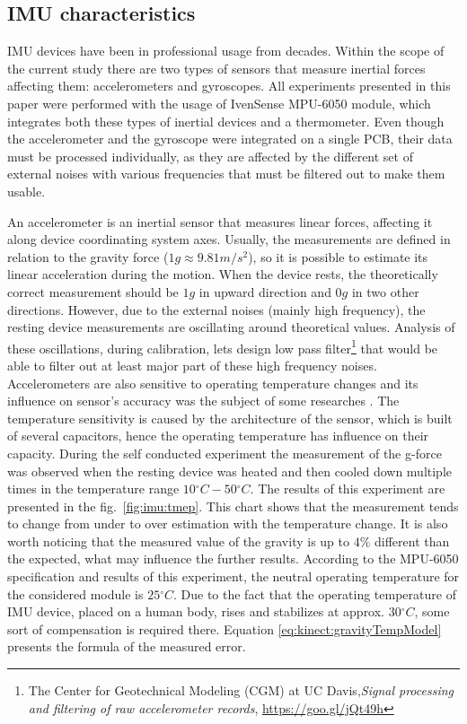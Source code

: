 \documentclass[sensors,article,submit,moreauthors,pdftex,10pt,a4paper]{mdpi}
\newcommand{\degree}{\ensuremath{{}^{\circ}}\xspace}
\begin{document}
	\subsection{IMU characteristics}
	IMU devices have been in professional usage from decades. Within the scope of the current study there are two types of sensors that measure inertial forces affecting them: accelerometers and gyroscopes. All experiments presented in this paper were performed with the usage of IvenSense MPU-6050 module, which integrates both these types of inertial devices and a thermometer. Even though the accelerometer and the gyroscope were integrated on a single PCB, their data must be processed individually, as they are affected by the different set of external noises with various frequencies that must be filtered out to make them usable.
	
	An accelerometer is an inertial sensor that measures linear forces, affecting it along device coordinating system axes. Usually, the measurements are defined in relation to the gravity force ($1g \approx 9.81  m/{s^2}$), so it is possible to estimate its linear acceleration during the motion. When the device rests, the theoretically correct measurement should be $1g$ in upward direction and $0g$ in two other directions. However, due to the external noises (mainly high frequency), the resting device measurements are oscillating around theoretical values. Analysis of these oscillations, during calibration, lets design low pass filter\footnote{The Center for Geotechnical Modeling (CGM) at UC Davis,\textit{Signal processing and filtering of raw accelerometer records}, \url{https://goo.gl/jQt49h}}\cite{Wang2011} that would be able to filter out at least major part of these high frequency noises. Accelerometers are also sensitive to operating temperature changes and its influence on sensor’s accuracy was the subject of some researches \cite{Schneider2006, Grigorie1996}. The temperature sensitivity is caused by the architecture of the sensor, which is built of several capacitors, hence the operating temperature has influence on their capacity. During the self conducted experiment the measurement of the g-force was observed when the resting device was heated and then cooled down multiple times in the temperature range $10\degree C - 50\degree C$. The results of this experiment are presented in the fig.~\ref{fig:imu:tmep}. This chart shows that the measurement tends to change from under to over estimation with the temperature change. It is also worth noticing that the measured value of the gravity is up to $4\%$ different than the expected, what may influence the further results. According to the MPU-6050 specification and results of this experiment, the neutral operating temperature for the considered module is $25\degree C$. Due to the fact that the operating temperature of IMU device, placed on a human body, rises and stabilizes at approx. $30 \degree C$, some sort of compensation is required there. Equation \ref{eq:kinect:gravityTempModel} presents the formula of the measured error.
	
\end{document}
